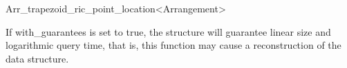 \begin{ccRefClass}{Arr_trapezoid_ric_point_location<Arrangement>}
\ccModifiers

  {If with\_guarantees is set to true, the structure will guarantee linear size and logarithmic query time, that is, this function may cause a reconstruction of the data structure. }

\ccSeeAlso
\\
\\

\end{ccRefClass}

\ccRefPageEnd
